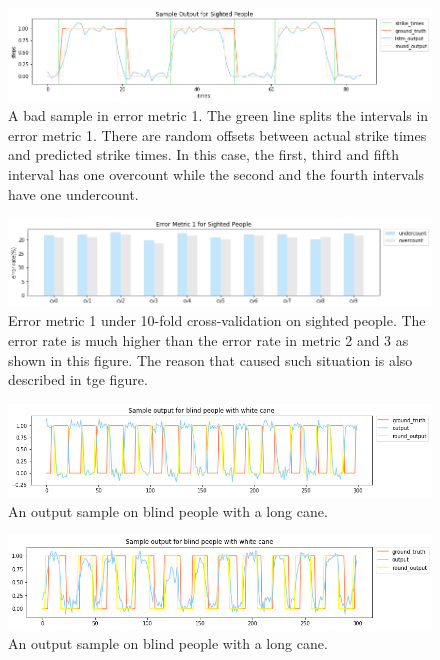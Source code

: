 \documentclass[11pt]{article}
\begin{document}
\begin{figure}[ht]
\centering
\includegraphics[scale=0.5]{output_small_metric2}
\caption{A bad sample in error metric 1. The green line splits the intervals in error metric 1. There are random offsets between actual strike times and predicted strike times. In this case, the first, third and fifth interval has one overcount while the second and the fourth intervals have one undercount.}
\label{fig:output_small_metric2}
\end{figure}




\begin{figure}[ht]
\centering
\includegraphics[scale=0.5]{error_metric_1_na_10fold}
\caption{Error metric 1 under 10-fold cross-validation on sighted people. The error rate is much higher than the error rate in metric 2 and 3 as shown in this figure. The reason that caused such situation is also described in tge figure.}
\label{fig:error_metric_1_na_10fold}
\end{figure}


\begin{figure}[ht]
\centering
\includegraphics[scale=0.5]{output_wc_1}
\caption{An output sample on blind people with a long cane.}
\label{fig:output_wc_1}
\end{figure}

\begin{figure}[ht]
\centering
\includegraphics[scale=0.5]{output_wc_2}
\caption{An output sample on blind people with a long cane.}
\label{fig:output_wc_2}
\end{figure}
\end{document}
